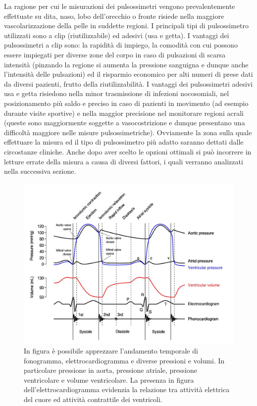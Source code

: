 \documentclass[a4paper, 12pt]{book}
\begin{document}
La ragione per cui le misurazioni dei pulsossimetri vengono prevalentemente effettuate su dita, naso, lobo dell'orecchio o fronte risiede nella maggiore vascolarizzazione della pelle in suddette regioni.
I principali tipi di pulsossimetro utilizzati sono a clip (riutilizzabile) ed adesivi (usa e getta).
I vantaggi dei pulsossimetri a clip sono: la rapidità di impiego, la comodità con cui possono essere impiegati per diverse zone del corpo in caso di pulsazioni di scarsa intensità (pinzando la regione si aumenta la pressione sanguigna e dunque anche l'intensità delle pulsazioni) ed il risparmio economico per alti numeri di prese dati da diversi pazienti, frutto della riutilizzabilità.
I vantaggi dei pulsossimetri adesivi usa e getta risiedono nella minor trasmissione di infezioni nocosomiali, nel posizionamento più saldo e preciso in caso di pazienti in movimento (ad esempio durante visite sportive) e nella maggior precisione nel monitorare regioni acrali (queste sono maggiormente soggette a vasocostrizione e dunque presentano una difficoltà maggiore nelle misure pulsossimetriche).
Ovviamente la zona sulla quale effettuare la misura ed il tipo di pulsossimetro più adatto saranno dettati dalle circostanze cliniche.
Anche dopo aver scelto le opzioni ottimali si può incorrere in letture errate della misura a causa di diversi fattori, i quali verranno analizzati nella successiva sezione.

\begin{figure}[h!]
	\includegraphics[width=\textwidth]{Wiggers_Diagram.jpg}
	\caption{In figura è possibile apprezzare l'andamento temporale di fonogramma, 					 	 elettrocardiogramma e diverse pressioni e volumi.
			 In particolare pressione in aorta, pressione atriale, pressione 							 ventricolare e volume ventricolare.
			 La presenza in figura dell'elettrocardiogramma evidenzia la relazione tra 				 	 attività elettrica del cuore ed attività contrattile dei ventricoli.}
	\label{fig:Wiggers_Diagram}
\end{figure}
\end{document}
